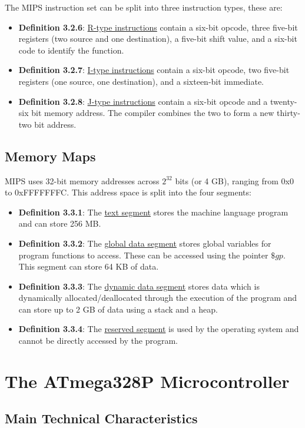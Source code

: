\documentclass{article}
\newcommand{\separate}[1] {\vspace{#1 pt}\noindent}
\newcommand{\definition}[2]{\textbf{Definition #1}: #2\label{def:#1}}
\begin{document}
\separate{7}The MIPS instruction set can be split into three instruction types, these are:
\begin{itemize}
    \item \definition{3.2.6}{\underline{R-type instructions} contain a six-bit opcode, three five-bit registers (two source and one destination), a five-bit shift value, and a six-bit code to identify the function.}
    \item \definition{3.2.7}{\underline{I-type instructions} contain a six-bit opcode, two five-bit registers (one source, one destination), and a sixteen-bit immediate.}
    \item \definition{3.2.8}{\underline{J-type instructions} contain a six-bit opcode and a twenty-six bit memory address. The compiler combines the two to form a new thirty-two bit address.}
\end{itemize}

\subsection{Memory Maps}

MIPS uses 32-bit memory addresses across \(2^32\) bits (or 4 GB), ranging from 0x0 to 0xFFFFFFFC. This address space is split into the four segments:
\begin{itemize}
    \item \definition{3.3.1}{The \underline{text segment} stores the machine language program and can store 256 MB.}
    \item \definition{3.3.2}{The \underline{global data segment} stores global variables for program functions to access. These can be accessed using the pointer \(\$gp\). This segment can store 64 KB of data.}
    \item \definition{3.3.3}{The \underline{dynamic data segment} stores data which is dynamically allocated/deallocated through the execution of the program and can store up to 2 GB of data using a stack and a heap.}
    \item \definition{3.3.4}{The \underline{reserved segment} is used by the operating system and cannot be directly accessed by the program.}
\end{itemize} 

\section{The ATmega328P Microcontroller}

\subsection{Main Technical Characteristics}
\end{document}
